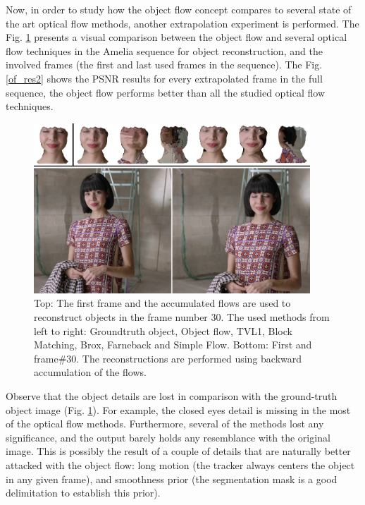 Now, in order to study how the object flow concept compares to several state of the art optical flow 
methods, another extrapolation experiment is performed. 
The Fig. \ref{compare2} presents a visual comparison between the object flow and several optical flow 
techniques in the Amelia sequence for object reconstruction, and the involved frames (the first and last used frames in the sequence). 
The Fig. \ref{of_res2} shows the PSNR results for every extrapolated frame in the full sequence, 
the object flow performs better than all the studied optical flow techniques.


   \begin{figure}[t]
      \centering
      \includegraphics[width=0.925\textwidth]{../images/compare2.png}
      \caption{Top: The first frame and the accumulated flows are used to reconstruct objects in the frame number 30. The used methods from left to right: Groundtruth object, Object flow, TVL1, Block Matching, Brox, Farneback and Simple Flow. 
		Bottom: First and frame\#30. The reconstructions are performed using backward accumulation of the flows.}
      \label{compare2}
   \end{figure}


Observe that the object details are lost in comparison with the ground-truth object image (Fig. \ref{compare2}). For example, the closed eyes detail is missing in the most of the optical 
flow methods. Furthermore, several of the methods lost any significance, and the output barely holds any resemblance with the original image. This is possibly the result of a couple of details that are naturally better attacked with the object flow: 
long motion (the tracker always centers the object in any given frame), and smoothness prior (the segmentation mask is a 
good delimitation to establish this prior).

